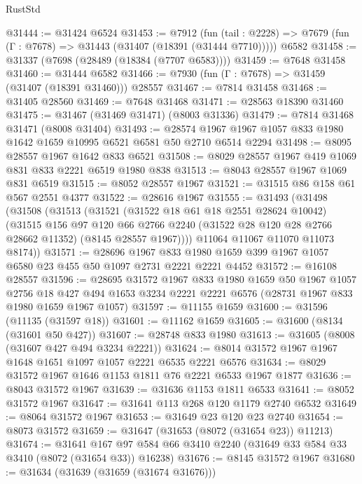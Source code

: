 \begin{lexlean}{RustStd}
\begin{coremodule}
{\begin{coremodule}
{{{{{{{{{{{{{{{{{{{{{{{{{{{{{{{{{{{{{{{{{{{{{{{{{{{{{@31444 := @31424 @6524
@31453 := @7912
    (fun (tail : @2228) => @7679 (fun (Γ : @7678) => @31443 (@31407 (@18391 (@31444 @7710)))))
    @6582
@31458 := @31337 (@7698 (@28489 (@18384 (@7707 @6583))))
@31459 := @7648 @31458
@31460 := @31444 @6582
@31466 := @7930 (fun (Γ : @7678) => @31459 (@31407 (@18391 @31460))) @28557
@31467 := @7814 @31458
@31468 := @31405 @28560
@31469 := @7648 @31468
@31471 := @28563 @18390 @31460
@31475 := @31467 (@31469 @31471) (@8003 @31336)
@31479 := @7814 @31468 @31471 (@8008 @31404)
@31493 := @28574 @1967 @1967 @1057 @833 @1980 @1642 @1659 @10995 @6521 @6581 @50 @2710 @6514 @2294
@31498 := @8095 @28557 @1967 @1642 @833 @6521
@31508 := @8029 @28557 @1967 @419 @1069 @831 @833 @2221 @6519 @1980 @838
@31513 := @8043 @28557 @1967 @1069 @831 @6519
@31515 := @8052 @28557 @1967
@31521 := @31515 @86 @158 @61 @567 @2551 @4377
@31522 := @28616 @1967
@31555 := @31493
    (@31498
      (@31508
        (@31513
          (@31521
            (@31522 @18 @61 @18 @2551 @28624 @10042)
            (@31515
              @156
              @97
              @120
              @66
              @2766
              @2240
              (@31522 @28 @120 @28 @2766 @28662 @11352)
              (@8145 @28557 @1967))))
        @11064
        @11067
        @11070
        @11073
        @8174))
@31571 := @28696
    @1967
    @833
    @1980
    @1659
    @399
    @1967
    @1057
    @6580
    @23
    @455
    @50
    @1097
    @2731
    @2221
    @2221
    @4452
@31572 := @16108 @28557
@31596 := @28695
    @31572
    @1967
    @833
    @1980
    @1659
    @50
    @1967
    @1057
    @2756
    @18
    @427
    @494
    @1653
    @3234
    @2221
    @2221
    @6576
    (@28731 @1967 @833 @1980 @1659 @1967 @1057)
@31597 := @11155 @1659
@31600 := @31596 (@11135 (@31597 @18))
@31601 := @11162 @1659
@31605 := @31600 (@8134 (@31601 @50 @427))
@31607 := @28748 @833 @1980
@31613 := @31605 (@8008 (@31607 @427 @494 @3234 @2221))
@31624 := @8014 @31572 @1967 @1967 @1648 @1651 @1097 @1057 @2221 @6535 @2221 @6576
@31634 := @8029 @31572 @1967 @1646 @1153 @1811 @76 @2221 @6533 @1967 @1877
@31636 := @8043 @31572 @1967
@31639 := @31636 @1153 @1811 @6533
@31641 := @8052 @31572 @1967
@31647 := @31641 @113 @268 @120 @1179 @2740 @6532
@31649 := @8064 @31572 @1967
@31653 := @31649 @23 @120 @23 @2740
@31654 := @8073 @31572
@31659 := @31647 (@31653 (@8072 (@31654 @23)) @11213)
@31674 := @31641
    @167
    @97
    @584
    @66
    @3410
    @2240
    (@31649 @33 @584 @33 @3410 (@8072 (@31654 @33)) @16238)
@31676 := @8145 @31572 @1967
@31680 := @31634 (@31639 (@31659 (@31674 @31676)))
}}}}}}}}}}}}}}}}}}}}}}}}}}}}}}}}}}}}}}}}}}}}}}}}}}}}}
\end{coremodule}}
\end{coremodule}
\end{lexlean}
